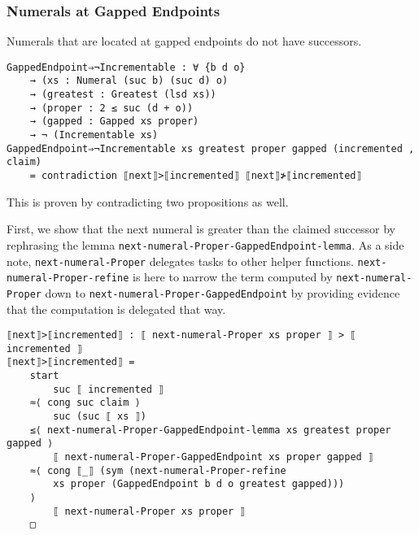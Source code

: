 \documentclass[\main/thesis.tex]{subfiles}
\begin{document}
\subsubsection{Numerals at Gapped Endpoints}

Numerals that are located at gapped endpoints do not have successors.

\begin{center}
    \begin{adjustbox}{max width=\textwidth}
    \end{adjustbox}
\end{center}

\begin{lstlisting}[basicstyle=\ttfamily\scriptsize]
GappedEndpoint⇒¬Incrementable : ∀ {b d o}
    → (xs : Numeral (suc b) (suc d) o)
    → (greatest : Greatest (lsd xs))
    → (proper : 2 ≤ suc (d + o))
    → (gapped : Gapped xs proper)
    → ¬ (Incrementable xs)
GappedEndpoint⇒¬Incrementable xs greatest proper gapped (incremented , claim)
    = contradiction ⟦next⟧>⟦incremented⟧ ⟦next⟧≯⟦incremented⟧
\end{lstlisting}

This is proven by contradicting two propositions as well.

First, we show that the next numeral is greater than the claimed successor
by rephrasing the lemma \lstinline|next-numeral-Proper-GappedEndpoint-lemma|.
As a side note, \lstinline|next-numeral-Proper| delegates tasks to other helper
functions. \lstinline|next-numeral-Proper-refine| is here to narrow the term
computed by \lstinline|next-numeral-Proper| down to
\lstinline|next-numeral-Proper-GappedEndpoint|
by providing evidence that the computation is delegated that way.

\begin{lstlisting}[basicstyle=\ttfamily\scriptsize]
⟦next⟧>⟦incremented⟧ : ⟦ next-numeral-Proper xs proper ⟧ > ⟦ incremented ⟧
⟦next⟧>⟦incremented⟧ =
    start
        suc ⟦ incremented ⟧
    ≈⟨ cong suc claim ⟩
        suc (suc ⟦ xs ⟧)
    ≤⟨ next-numeral-Proper-GappedEndpoint-lemma xs greatest proper gapped ⟩
        ⟦ next-numeral-Proper-GappedEndpoint xs proper gapped ⟧
    ≈⟨ cong ⟦_⟧ (sym (next-numeral-Proper-refine
        xs proper (GappedEndpoint b d o greatest gapped)))
    ⟩
        ⟦ next-numeral-Proper xs proper ⟧
    □
\end{lstlisting}
\end{document}
